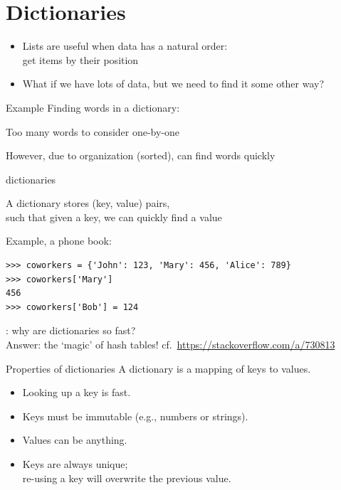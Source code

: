 \documentclass[aspectratio=169,usenames,dvipsnames]{beamer}
\begin{document}
\section{Dictionaries}
\frame{\tableofcontents[currentsection]}

\begin{frame}
    \begin{itemize}
        \item Lists are useful when data has a natural order: \\
            get items by their position
        \pause
        \item What if we have lots of data,
            but we need to find it some other way?
    \end{itemize}

    \begin{block}{Example}
    Finding words in a dictionary:

    Too many words to consider one-by-one

    However, due to organization (sorted), can find words quickly
    \end{block}
\end{frame}


\begin{frame}[fragile]{dictionaries}
    \begin{definition}
        A dictionary stores (key, value) pairs, \\
        such that given a key, we can quickly find a value
    \end{definition}
\pause
Example, a phone book:
\begin{lstlisting}
>>> coworkers = {'John': 123, 'Mary': 456, 'Alice': 789}
>>> coworkers['Mary']
456
>>> coworkers['Bob'] = 124
\end{lstlisting}

\vspace{1em}
: why are dictionaries so fast?\\
Answer: the `magic' of hash tables!
    cf.~\url{https://stackoverflow.com/a/730813}
\end{frame}

\begin{frame}{Properties of dictionaries}
A dictionary is a mapping of keys to values.

    \begin{itemize}
        \item Looking up a key is fast.
        \item Keys must be immutable (e.g., numbers or strings).
        \item Values can be anything.
        \item Keys are always unique; \\
            re-using a key will overwrite the previous value.
    \end{itemize}
\end{frame}
\end{document}
